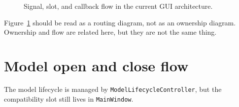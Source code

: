 \begin{figure}[htbp]
\centering
\caption{Signal, slot, and callback flow in the current GUI architecture.}
\label{fig:gui-architecture-signal-flow}
\end{figure}

Figure~\ref{fig:gui-architecture-signal-flow} should be read as a routing diagram, not as an ownership diagram. Ownership and flow are related here, but they are not the same thing.

\section{Model open and close flow}
\label{sec:gui-architecture-model-open}

The model lifecycle is managed by \texttt{ModelLifecycleController}, but the compatibility slot still lives in \texttt{MainWindow}.


